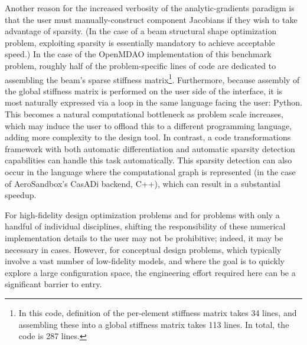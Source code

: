 Another reason for the increased verbosity of the analytic-gradients paradigm is that the user must manually-construct component Jacobians if they wish to take advantage of sparsity. (In the case of a beam structural shape optimization problem, exploiting sparsity is essentially mandatory to achieve acceptable speed.) In the case of the OpenMDAO implementation of this benchmark problem, roughly half of the problem-specific lines of code are dedicated to assembling the beam's sparse stiffness matrix\footnote{In this code, definition of the per-element stiffness matrix takes 34 lines, and assembling these into a global stiffness matrix takes 113 lines. In total, the code is 287 lines.}. Furthermore, because assembly of the global stiffness matrix is performed on the user side of the interface, it is most naturally expressed via a loop in the same language facing the user: Python. This becomes a natural computational bottleneck as problem scale increases, which may induce the user to offload this to a different programming language, adding more complexity to the design tool. In contrast, a code transformations framework with both automatic differentiation and automatic sparsity detection capabilities can handle this task automatically. This sparsity detection can also occur in the language where the computational graph is represented (in the case of AeroSandbox's CasADi backend, C++), which can result in a substantial speedup.

For high-fidelity design optimization problems and for problems with only a handful of individual disciplines, shifting the responsibility of these numerical implementation details to the user may not be prohibitive; indeed, it may be necessary in cases. However, for conceptual design problems, which typically involve a vast number of low-fidelity models, and where the goal is to quickly explore a large configuration space, the engineering effort required here can be a significant barrier to entry.

